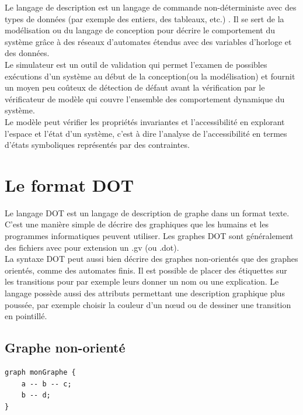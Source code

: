 \documentclass[12pt,a4paper]{report}
\begin{document}
  Le langage de description est un langage de commande non-déterministe avec des   
  types de données (par exemple des entiers, des tableaux, etc.) . Il se sert de la 
  modélisation ou du langage de conception pour décrire le comportement du système 
  grâce à des réseaux d'automates étendus avec des variables d'horloge et des données.\\ 

  Le simulateur est un outil de validation qui permet l'examen de possibles 
  exécutions d'un système au début de la conception(ou la modélisation) et fournit 
  un moyen peu coûteux de détection de défaut avant la vérification par le vérificateur 
  de modèle qui couvre l'ensemble des comportement dynamique du système.\\

  Le modèle peut vérifier les propriétés invariantes et l'accessibilité 
  en explorant l'espace et l'état d'un système, c'est à dire l'analyse de l'accessibilité 
  en termes d'états symboliques représentés par des contraintes.

\section{Le format DOT}

  Le langage DOT est un langage de description de graphe dans un format texte. C'est une manière simple de décrire des graphiques que les humains et les programmes informatiques peuvent utiliser. Les graphes DOT sont généralement des fichiers avec pour extension un .gv (ou .dot).\\

  La syntaxe DOT peut aussi bien décrire des graphes non-orientés que des graphes orientés, comme des automates finis.
  Il est possible de placer des étiquettes sur les transitions pour par exemple leurs donner un nom ou une explication. Le langage possède aussi des attributs permettant une description graphique plus poussée, par exemple choisir la couleur d'un nœud ou de dessiner une transition en pointillé.

\subsection{Graphe non-orienté}

\begin{lstlisting}[caption=Description textuelle en DOT]
graph monGraphe {
    a -- b -- c;
    b -- d;
}
\end{lstlisting}
\end{document}

